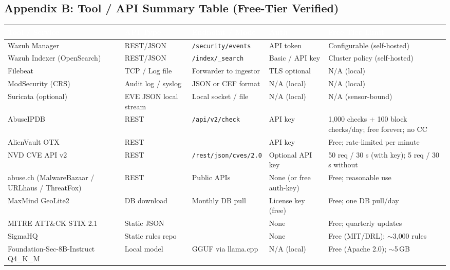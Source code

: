 \documentclass[11pt,a4paper]{article}
\begin{document}
\subsection{Appendix B: Tool / API Summary Table (Free-Tier Verified)}

\begin{longtable}{|>{}L{2.4cm}|L{2.0cm}|L{3.6cm}|L{2.6cm}|L{3.0cm}|}
\hline
{}\textcolor{white}{\textbf{Tool / Service}} & \textcolor{white}{\textbf{API Type}} & \textcolor{white}{\textbf{Endpoint / Mode}} & \textcolor{white}{\textbf{Auth}} & \textcolor{white}{\textbf{Free Tier Limit}} \\
\hline
\endhead
Wazuh Manager & REST/JSON & \texttt{/security/events} & API token & Configurable (self-hosted) \\
\hline
Wazuh Indexer (OpenSearch) & REST/JSON & \texttt{/index/\_search} & Basic / API key & Cluster policy (self-hosted) \\
\hline
Filebeat & TCP / Log file & Forwarder to ingestor & TLS optional & N/A (local) \\
\hline
ModSecurity (CRS) & Audit log / syslog & JSON or CEF format & N/A (local) & N/A (local) \\
\hline
Suricata (optional) & EVE JSON local stream & Local socket / file & N/A (local) & N/A (sensor-bound) \\
\hline
AbuseIPDB & REST & \texttt{/api/v2/check} & API key & 1{,}000 checks + 100 block checks/day; free forever; no CC \\
\hline
AlienVault OTX & REST &  & API key & Free; rate-limited per minute \\
\hline
NVD CVE API v2 & REST & \texttt{/rest/json/cves/2.0} & Optional API key & 50 req / 30 s (with key); 5 req / 30 s without \\
\hline
abuse.ch (MalwareBazaar / URLhaus / ThreatFox) & REST & Public APIs & None (or free auth-key) & Free; reasonable use \\
\hline
MaxMind GeoLite2 & DB download & Monthly DB pull & License key (free) & Free; one DB pull/day \\
\hline
MITRE ATT\&CK STIX 2.1 & Static JSON &  & None & Free; quarterly updates \\
\hline
SigmaHQ & Static rules repo &  & None & Free (MIT/DRL); $\sim$3{,}000 rules \\
\hline
Foundation-Sec-8B-Instruct Q4\_K\_M & Local model & GGUF via llama.cpp & N/A (local) & Free (Apache 2.0); $\sim$5\,GB \\

\end{longtable}
\end{document}
